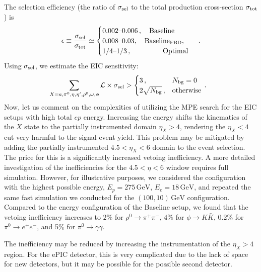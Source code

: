 \documentclass[aps,prd,preprintnumbers,superscriptaddress,nofootinbib,floatfix,twocolumn,notitlepage,reprint]{revtex4-2}
\newcommand{\cL}{\mathcal{L}}
\newcommand{\GeV}{\mathrm{GeV}}
\begin{document}
The selection efficiency (the ratio of $\sigma_{\rm sel}$ to the total production cross-section $\sigma_{\rm tot}$) is
%
\begin{align}
    \epsilon 
    \equiv 
    \frac{\sigma_{\text{sel}}}{\sigma_{\text{tot}}} 
    \simeq 
    \begin{cases} 
    0.002\text{--}0.006\,, \quad \text{Baseline} \\ 0.008\text{--}0.03, \quad \text{Baseline}_{\rm FBD}, \\  
     1/4\text{--}1/3 \,, \quad\quad\quad\quad\ \, \text{Optimal}
    \end{cases}\, .
\end{align}
%
Using $\sigma_{\rm sel}$, we estimate the EIC sensitivity:
%
\begin{align}
    &\sum_{X = a,\pi^{0},\eta,\eta',\rho^{0},\omega,\phi} \cL\times \sigma_{\rm sel} > \begin{cases}
        3\,, \;\;\;\;\;\; & N_{\text{bg}}=0
        \\
        2\sqrt{N_{\text{bg}}}\,, & \text{otherwise}
    \end{cases}\,.
\end{align}
%
Now, let us comment on the complexities of utilizing the MPE search for the EIC setups with high total $ep$ energy. Increasing the energy shifts the kinematics of the $X$ state to the partially instrumented domain $\eta_{X}>4$, rendering the $\eta_{X}<4$ cut very harmful to the signal event yield.
This problem may be mitigated by adding the partially instrumented $4.5<\eta_X<6$ domain to the event selection. 
The price for this is a significantly increased vetoing inefficiency. 
A more detailed investigation of the inefficiencies for the $4.5<\eta<6$ window requires full simulation. 
However, for illustrative purposes, we considered the configuration with the highest possible energy, $E_{p} = 275\,\GeV$, $E_{e} = 18\,\GeV$, and repeated the same fast simulation we conducted for the $(100,10)\,\GeV$ configuration. 
Compared to the energy configuration of the Baseline setup, we found that the vetoing inefficiency increases to $2\%$ for $\rho^{0}\to \pi^{+}\pi^{-}$, $4\%$ for $\phi\to K\bar{K}$, 
$0.2\%$ for $\pi^{0}\to e^{+}e^{-}$, and 5\% for $\pi^{0}\to\gamma\gamma$.

The inefficiency may be reduced by increasing the instrumentation of the $\eta_{X}>4$ region. 
For the ePIC detector, this is very complicated due to the lack of space for new detectors, but it may be possible for the possible second detector.%
\end{document}
